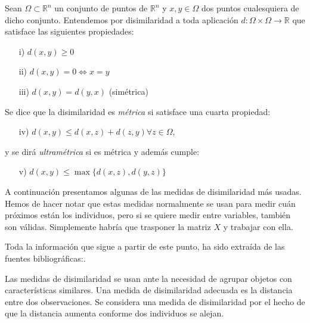 \begin{definicion}
    Sean $\Omega \subset \mathbb{R}^{n}$ un conjunto de puntos de $\mathbb{R}^{n}$ y $x,y \in \Omega$ dos puntos cualesquiera de dicho conjunto. Entendemos por disimilaridad a toda 
    aplicación $d: \Omega \times \Omega \longrightarrow \mathbb{R}$ que satisface las siguientes propiedades:

    \begin{itemize}
        \item[i)] $d(x,y) \ge 0$
        \item[ii)] $d(x,y)= 0 \Longleftrightarrow x = y$
        \item[iii)] $d(x,y) = d(y,x)$ (simétrica)
    \end{itemize}
    Se dice que la disimilaridad es \textit{métrica} si satisface una cuarta propiedad:
    \begin{itemize}
        \item[iv)] $d(x,y) \leq d(x,z) + d(z,y) \forall z \in \Omega$, 
    \end{itemize}
        
    y se dirá \textit{ultramétrica} si es métrica y además cumple:
        
    \begin{itemize}
        \item[v)] $d(x,y) \leq \max\{d(x,z),d(y,z)\}$
    \end{itemize}
        
\end{definicion}

\vspace{0.2cm}
A continuación presentamos algunas de las medidas de disimilaridad más usadas. Hemos de hacer notar que estas medidas normalmente se usan para medir cuán próximos están los individuos, 
pero si se quiere medir entre variables, también son válidas. Simplemente habría que trasponer la matriz $X$ y trabajar con ella. \newline

Toda la información que sigue a partir de este punto, ha sido extraída de las fuentes bibliográficas:\cite{Bib-1, Bib-5, Bib-6, clustering-2, clustering-1}. \newline


Las medidas de disimilaridad se usan ante la necesidad de agrupar objetos con características similares. Una medida de disimilaridad adecuada es la distancia entre 
dos observaciones. Se considera una medida de disimilaridad por el hecho de que la distancia aumenta conforme dos individuos se alejan. \newline

